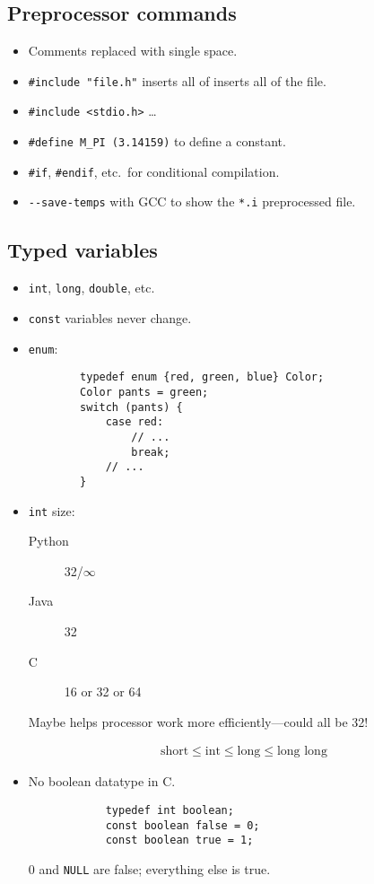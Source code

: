 \subsection{Preprocessor commands}
\begin{itemize}
	\item Comments replaced with single space.
	\item \texttt{\#include "file.h"} inserts all of {inserts all of the file}.
	\item \texttt{\#include <stdio.h>} \ldots
	\item \texttt{\#define M\_PI (3.14159)} to define a constant.
	\item \texttt{\#if}, \texttt{\#endif}, etc.\ for conditional compilation.
	\item \texttt{-{}-save-temps} with GCC to show the \texttt{*.i} preprocessed file.
\end{itemize}

\subsection{Typed variables}
\begin{itemize}
	\item \texttt{int}, \texttt{long}, \texttt{double}, etc.
	\item \texttt{const} variables never change.
	\item \texttt{enum}:
	
	\begin{verbatim}
		typedef enum {red, green, blue} Color;
		Color pants = green;
		switch (pants) {
			case red:
				// ...
				break;
			// ...
		}
	\end{verbatim}
	\item \texttt{int} size:\begin{description}
		\item[Python] 32/\(\infty\)
		\item[Java] 32
		\item[C] 16 or 32 or 64
	\end{description}
	
	Maybe helps processor work more efficiently---could all be 32!
	
	\begin{align*}
		\text{short} \leq \text{int} \leq \text{long} \leq \text{long long}
	\end{align*}
	\item No boolean datatype in C.
		\begin{verbatim}
			typedef int boolean;
			const boolean false = 0;
			const boolean true = 1;
		\end{verbatim}
		
		0 and \texttt{NULL} are false; everything else is true.
\end{itemize}

